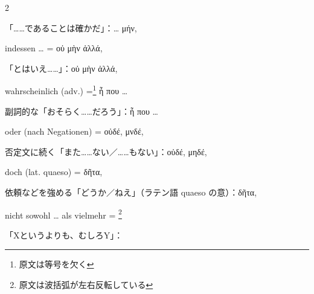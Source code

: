 \begin{paracol}{2}
\begin{enumerate}[leftmargin=0pt,rightmargin=0pt,listparindent =1cm,labelindent=1cm,labelsep=1ex,labelwidth={*},itemindent={*},align=left]
\begin{japanese}
「……であることは確かだ」：\textgreek[variant=ancient]{\ldots{} μήν,}
\end{japanese}
\switchcolumn*

\begin{german}
indessen \ldots{} = \textgreek[variant=ancient]{οὐ μὴν ἀλλά,}
\end{german}
\switchcolumn

\begin{japanese}
「とはいえ……」：\textgreek[variant=ancient]{οὐ μὴν ἀλλά,}
\end{japanese}
\switchcolumn*

\begin{german}
wahrscheinlich (adv.) =\footnote{\textjapanese{原文は等号を欠く}}%
\textgreek[variant=ancient]{ἦ που \ldots{}}
\end{german}
\switchcolumn

\begin{japanese}
副詞的な「おそらく……だろう」：\textgreek[variant=ancient]{ἦ που \ldots{}}
\end{japanese}
\switchcolumn*

\begin{german}
oder (nach Negationen) = \textgreek[variant=ancient]{οὐδέ, μνδέ,}
\end{german}
\switchcolumn

\begin{japanese}
否定文に続く「また……ない／……もない」：\textgreek[variant=ancient]{οὐδέ, μηδέ,}
\end{japanese}
\switchcolumn*

\begin{german}
doch (lat. \textlatin{quaeso}) = \textgreek[variant=ancient]{δῆτα,}
\end{german}
\switchcolumn

\begin{japanese}
依頼などを強める「どうか／ねえ」（ラテン語 \textlatin{quaeso} の意）：\textgreek[variant=ancient]{δῆτα,}
\end{japanese}
\switchcolumn*

\begin{german}
nicht sowohl \textgreek[variant=ancient]{\ldots{}} als vielmehr =
\footnote{\textjapanese{原文は波括弧が左右反転している}}%
\end{german}
\switchcolumn

\begin{japanese}
「Xというよりも、むしろY」：
\end{japanese}
\switchcolumn*


\end{enumerate}
\end{paracol}
